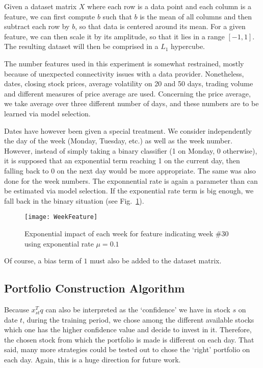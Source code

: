 \documentclass[11pt,fleqn]{article}
\newcommand{\figref}[1]{Fig.~\ref{#1}}
\begin{document}
Given a dataset matrix $X$ where each row is a data point and each column is a feature, we
can first compute $b$ such that $b$ is the mean of all columns and then subtract each row
by $b$, so that data is centered around its mean. For a given feature, we can then scale
it by its amplitude, so that it lies in a range $[-1,1]$. The resulting dataset will then
be comprised in a $L_1$ hypercube. 

The number features used in this experiment is somewhat restrained, mostly because of
unexpected connectivity issues with a data provider. Nonetheless, dates, closing stock
prices, average volatility on 20 and 50 days, trading volume and different measures of
price average are used. Concerning the price average, we take average over three different
number of days, and these numbers are to be learned via model selection. 

Dates have however been given a special treatment. We consider independently the day of
the week (Monday, Tuesday, etc.) as well as the week number. However, instead of simply
taking a binary classifier (1 on Monday, 0 otherwise), it is supposed that an exponential
term reaching 1 on the current day, then falling back to 0 on the next day would be more
appropriate. The same was also done for the week numbers. The exponnential rate is again a
parameter than can be estimated via model selection. If the exponential rate term is big
enough, we fall back in the binary situation (see \figref{fig:weekfeature}).

\begin{figure}
  \centering
  \texttt{[image: WeekFeature]}
  \caption{Exponential impact of each week for feature indicating week \#30 using
    exponential rate $\mu=0.1$}
  \label{fig:weekfeature}
\end{figure}

Of course, a bias term of $1$ must also be added to the dataset matrix. 


\subsection{Portfolio Construction Algorithm}

Because $x_{st}^Tq$ can also be interpreted as the `confidence' we have in stock $s$ on
date $t$, during the training period, we chose among the different available stocks which
one has the higher confidence value and decide to invest in it. Therefore, the chosen
stock from which the portfolio is made is different on each day. That said, many more
strategies could be tested out to chose the `right' portfolio on each day. Again, this is
a huge direction for future work. 
\end{document}
